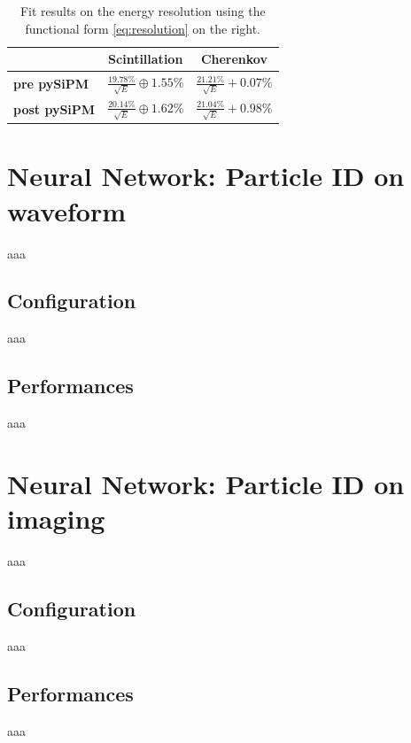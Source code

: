 \begin{table}
	\centering
	\begin{tabular}{lcc}
		\toprule
		& \textbf{Scintillation} & \textbf{Cherenkov} \\
		\midrule
		\textbf{pre pySiPM} &	$\frac{19.78\%}{\sqrt{E}}\oplus1.55\%$ 	& $\frac{21.21\%}{\sqrt{E}}+0.07\%$ \\
		\textbf{post pySiPM} & $\frac{20.14\%}{\sqrt{E}}\oplus1.62\%$ 	& $\frac{21.04\%}{\sqrt{E}}+0.98\%$ \\
		\bottomrule
	\end{tabular}
	\caption{Fit results on the energy resolution using the functional form \ref{eq:resolution} on the right.}
	\label{tab:res_quadratic_sum}
\end{table}

\section{Neural Network: Particle ID on waveform} \label{sec:NN_waveform}
aaa

\subsection{Configuration}
aaa

\subsection{Performances}
aaa

\section{Neural Network: Particle ID on imaging} \label{sec:NN_img}
aaa

\subsection{Configuration}
aaa

\subsection{Performances}
aaa